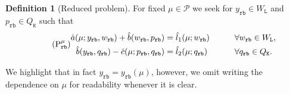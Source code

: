 \documentclass{article}
\theoremstyle{plain}
\theoremstyle{definition}
\newtheorem{definition}[theorem]{Definition}
\theoremstyle{remark}
\begin{document}
\begin{definition}[Reduced problem] 
For fixed $\mu \in \mathcal{P}$ we seek for $y_\texttt{rb} \in W_\texttt{L}$ and $p_\texttt{rb} \in Q_\texttt{K}$ such that
\begin{equation}\tag{\ensuremath{\text P^\mu_\texttt{rb}}}\label{eq:reduziertesproblem}
\begin{aligned}
    \hat{a}(\mu; y_\texttt{rb},w_\texttt{rb}) + \hat{b}(w_\texttt{rb},p_\texttt{rb}) &= \hat{l}_1(\mu; w_\texttt{rb}) \qquad &&\forall w_\texttt{rb} \in W_\texttt{L},\\
    \hat{b}(y_\texttt{rb},q_\texttt{rb}) -\hat{c}(\mu; p_\texttt{rb},q_\texttt{rb}) &= \hat{l}_2(\mu; q_\texttt{rb}) \qquad &&\forall q_\texttt{rb} \in Q_\texttt{K}.
\end{aligned}    
\end{equation}
\end{definition}
We highlight that in fact $y_\texttt{rb} = y_\texttt{rb}(\mu)$, however, we omit writing the dependence on $\mu$ for readability whenever it is clear.
\end{document}
